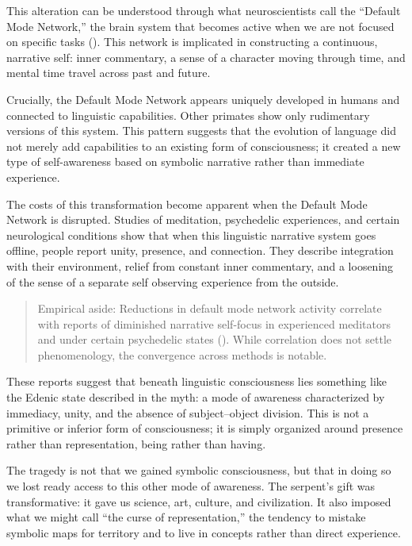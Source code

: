 This alteration can be understood through what neuroscientists call the “Default Mode Network,” the brain system that becomes active when we are not focused on specific tasks (\parencite{raichle2001default,buckner2008brain}). This network is implicated in constructing a continuous, narrative self: inner commentary, a sense of a character moving through time, and mental time travel across past and future.

Crucially, the Default Mode Network appears uniquely developed in humans and connected to linguistic capabilities. Other primates show only rudimentary versions of this system. This pattern suggests that the evolution of language did not merely add capabilities to an existing form of consciousness; it created a new type of self-awareness based on symbolic narrative rather than immediate experience.

The costs of this transformation become apparent when the Default Mode Network is disrupted. Studies of meditation, psychedelic experiences, and certain neurological conditions show that when this linguistic narrative system goes offline, people report unity, presence, and connection. They describe integration with their environment, relief from constant inner commentary, and a loosening of the sense of a separate self observing experience from the outside.

\begin{quote}\small
Empirical aside: Reductions in default mode network activity correlate with reports of diminished narrative self-focus in experienced meditators and under certain psychedelic states (\parencite{davidson2003alterations,lazar2005meditation,carhart-harris2012neural}). While correlation does not settle phenomenology, the convergence across methods is notable.
\end{quote}

These reports suggest that beneath linguistic consciousness lies something like the Edenic state described in the myth: a mode of awareness characterized by immediacy, unity, and the absence of subject–object division. This is not a primitive or inferior form of consciousness; it is simply organized around presence rather than representation, being rather than having.

The tragedy is not that we gained symbolic consciousness, but that in doing so we lost ready access to this other mode of awareness. The serpent's gift was transformative: it gave us science, art, culture, and civilization. It also imposed what we might call “the curse of representation,” the tendency to mistake symbolic maps for territory and to live in concepts rather than direct experience.

